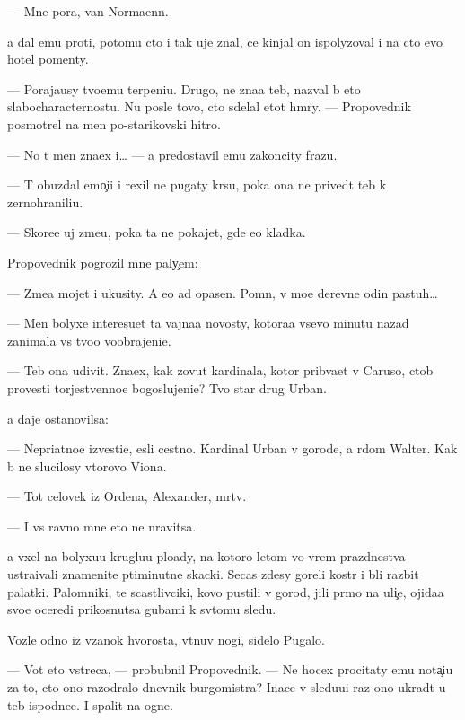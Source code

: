 \documentclass[10pt]{book}
\begin{document}
— Mne pora, van Normaenn.

{\Y}a dal {\y}emu pro{\y}ti, potomu cto i tak uje znal, ce{\y} kinjal on ispolyzoval i na cto {\y}evo hotel pomen{\ia}ty.



— Poraja{\y}usy tvo{\y}emu terpeni{\y}u. Drugo{\y}, ne zna{\y}a teb{\ia}, nazval b{\yi} eto slabo\-character\-no\-st{\y}u. Nu posle tovo, cto sdelal etot hm{\yi}ry. — Pro\-po\-ved\-nik posmotrel na men{\ia} po-starikovski hitro.

— No t{\yi} men{\ia} zna\-{\y}ex i… — {\Y}a predostavil {\y}emu zakoncity frazu.

— T{\yi} obuzdal emo{\c}i{\y}i i rexil ne pugaty kr{\yi}su, poka ona ne prived{\e}t teb{\ia} k zernohranili{\x}u.

— Skore{\y}e uj zme{\y}u, poka ta ne pokajet, gde {\y}e{\y}o kladka.

Pro\-po\-ved\-nik pogrozil mne paly{\c}em:

— Zme{\y}a mojet i ukusity. A {\y}e{\y}o {\y}ad opasen. Pomn{\io}, v mo{\y}e{\y} derevne odin pastuh…

— Men{\ia} bolyxe interesu{\y}et ta vajna{\y}a novosty, kotora{\y}a vsevo minutu nazad zanimala vs{\e} tvo{\y}o voobrajeni{\y}e.

— Teb{\ia} ona udivit. Zna{\y}ex, kak zovut kardinala, kotor{\yi}{\y} prib{\yi}va{\y}et v Caruso, ctob{\yi} provesti torjestvenno{\y}e bogoslujeni{\y}e? Tvo{\y} star{\yi}{\y} drug Urban.

{\Y}a daje ostanovilsa:

— Nepri{\y}atno{\y}e izvesti{\y}e, {\y}esli cestno. Kardinal Urban v gorode, a r{\ia}dom Walter. Kak b{\yi} ne slucilosy vtorovo Viona.

— Tot celovek iz Ordena, Alexander, m{\e}rtv.

— I vs{\e} ravno mne eto ne nravitsa.

{\Y}a v{\yi}xel na bolyxu{\y}u kruglu{\y}u plo{\x}ady, na kotoro{\y} letom vo vrem{\ia} prazdnestva ustra{\y}ivali znamenit{\yi}{\y}e p{\ia}timinutn{\yi}{\y}e skacki. Se{\y}cas zdesy goreli kostr{\yi} i b{\yi}li razbit{\yi} palatki. Palomniki, te scastlivciki, kovo pustili v gorod, jili pr{\ia}mo na uli{\c}e, ojida{\y}a svo{\y}e{\y} oceredi prikosnutsa gubami k sv{\ia}tomu sledu.

Vozle odno{\y} iz v{\ia}zanok hvorosta, v{\yi}t{\ia}nuv nogi, sidelo Pugalo.

— Vot eto vstreca, — probubnil Pro\-po\-ved\-nik. — Ne hocex procitaty {\y}emu nota{\c}i{\y}u za to, cto ono razodralo dnevnik burgomistra? Inace v sledu{\y}u{\x}i{\y} raz ono ukrad{\e}t u teb{\ia} ispodne{\y}e. I spalit na ogne.
\end{document}
